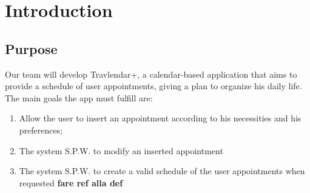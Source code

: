 \chapter{Introduction}

\section{Purpose}

Our team will develop Travlendar+, a calendar-based application that aims to provide a schedule of user appointments, giving a plan to organize his daily life.
The main goals the app must fulfill are:

\begin{enumerate}
\renewcommand\labelenumi{\textbf{G\theenumi}}

\item Allow the user to insert an appointment according to his necessities and his preferences;  \label{goal:G1}

\item The system S.P.W. to modify an inserted appointment 

\item The system S.P.W. to create a valid schedule of the user appointments when requested \textbf{fare ref alla def} \label{goal:G2}


\end{enumerate}
